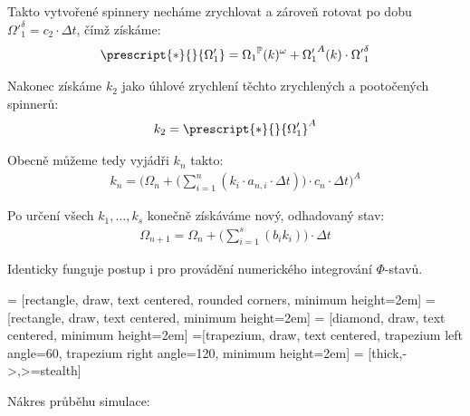 \documentclass[12pt, a4paper,
 twoside,        %
 openright
]{report}
\begin{document}
Takto vytvořené spinnery necháme zrychlovat a zároveň rotovat po dobu ${\Omega'}_1^\delta = c_2 \cdot \Delta t$, čímž získáme: 
\begin{equation}
    \label{eq:sim_equations_formalized9}
    \begin{gathered}
        \prescript{*}{}{\Omega_1'} = {\Omega_1}^{\mathbb{P}} (k) ^{\omega} + {\Omega_1'}^{A} (k) \cdot {\Omega'}_1^\delta
    \end{gathered}
\end{equation}

Nakonec získáme $k_2$ jako úhlové zrychlení těchto zrychlených a pootočených spinnerů: 
\begin{equation}
    \label{eq:sim_equations_formalized9}
    \begin{gathered}
        k_2 = \prescript{*}{}{\Omega_1'}^{A}
    \end{gathered}
\end{equation}

Obecně můžeme tedy vyjádři $k_{n}$ takto: 
\begin{equation}
    \label{eq:sim_equations_formalized6}
    \begin{gathered}
        k_{n} = \Bigg( {\Omega_n} + \Bigg( \sum_{i=1}^{n} ( k_i \cdot a_{n, i} \cdot \Delta t) \Bigg) \cdot c_{n} \cdot \Delta t \Bigg)^A
    \end{gathered}
\end{equation}

Po určení všech $k_1, \ldots, k_s$ konečně získáváme nový, odhadovaný stav:
\begin{equation}
    \label{eq:sim_equations_formalized6}
    \begin{gathered}
        {\Omega_{n+1}} = \Omega_{n} + \Bigg(\sum_{i=1}^{s} ( b_i k_i)\Bigg) \cdot \Delta t
    \end{gathered}
\end{equation}

Identicky funguje postup i pro provádění numerického integrování $\Phi$-stavů.

 = [rectangle, draw, text centered, rounded corners, minimum height=2em]
 = [rectangle, draw, text centered, minimum height=2em]
 = [diamond, draw, text centered, minimum height=2em]
=[trapezium, draw, text centered, trapezium left angle=60, trapezium right angle=120, minimum height=2em]
 = [thick,->,>=stealth]

Nákres průběhu simulace:

\end{document}
